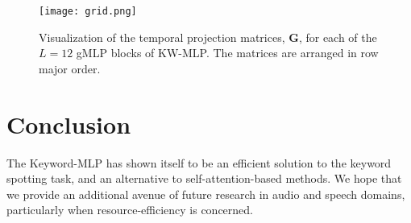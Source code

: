 \documentclass{article} \usepackage{iclr2022_conference,times}
\def\mG{{\bm{G}}}
\begin{document}
\begin{figure}[h]
\centering
    \texttt{[image: grid.png]}
\caption{Visualization of the temporal projection matrices, $\mG$, for each of the $L=12$ gMLP blocks of KW-MLP. The matrices are arranged in row major order.}
\label{fig:temp-matrix}
\end{figure}

\section{Conclusion}
The Keyword-MLP has shown itself to be an efficient solution to the keyword spotting task, and an alternative to self-attention-based methods. We hope that we provide an additional avenue of future research in audio and speech domains, particularly when resource-efficiency is concerned.





\end{document}
